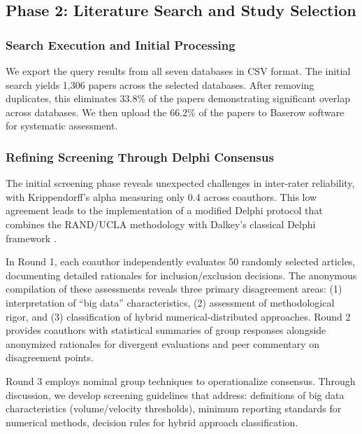 \documentclass[acmsmall]{acmart}
\begin{document}
\subsection{Phase 2: Literature Search and Study Selection}\label{subsec:phase-2-literature-search-and-study-selection}
\subsubsection{Search Execution and Initial Processing}\label{subsubsec:phase-2-literature-search-and-study-selection:search-execution-and-initial-processing}
We export the query results from all seven databases in CSV format. The initial search yields 1,306 papers across the selected databases. After removing duplicates, this eliminates 33.8\% of the papers demonstrating significant overlap across databases. We then upload the 66.2\% of the papers to Baserow software for systematic assessment.


\subsubsection{Refining Screening Through Delphi Consensus}\label{subsubsec:phase-2-literature-search-and-study-selection:refining-screening-through-delphi-consensus}
The initial screening phase reveals unexpected challenges in inter-rater reliability, with Krippendorff's alpha measuring only 0.4 across coauthors. This low agreement leads to the implementation of  a modified Delphi protocol that combines the RAND/UCLA methodology \citep{fitch2001rand} with Dalkey's classical Delphi framework \citep{dalkey1969delphi}.

In Round 1, each coauthor independently evaluates 50 randomly selected articles, documenting detailed rationales for inclusion/exclusion decisions. The anonymous compilation of these assessments reveals three primary disagreement areas: (1) interpretation of ``big data'' characteristics, (2) assessment of methodological rigor, and (3) classification of hybrid numerical-distributed approaches. Round 2 provides coauthors with statistical summaries of group responses alongside anonymized rationales for divergent evaluations and peer commentary on disagreement points.

Round 3 employs nominal group techniques \citep{delbecq1971group} to operationalize consensus. Through discussion, we develop  screening guidelines that address:  definitions of big data characteristics (volume/velocity thresholds), minimum reporting standards for numerical methods, decision rules for hybrid approach classification.
\end{document}
